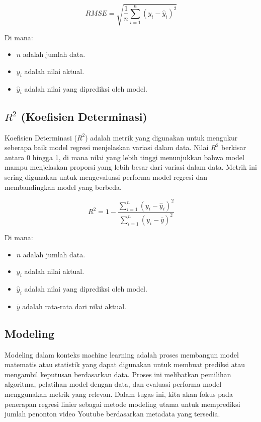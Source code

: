 \begin{equation}
    RMSE = \sqrt{\frac{1}{n} \sum_{i=1}^{n} (y_i - \hat{y}_i)^2}
\end{equation}

Di mana:
\begin{itemize}
    \item $n$ adalah jumlah data.
    \item $y_i$ adalah nilai aktual.
    \item $\hat{y}_i$ adalah nilai yang diprediksi oleh model.
\end{itemize}

\subsection{$R^2$ (Koefisien Determinasi)}
Koefisien Determinasi ($R^2$) adalah metrik yang digunakan untuk mengukur seberapa baik model regresi menjelaskan variasi dalam data. Nilai $R^2$ berkisar antara 0 hingga 1, di mana nilai yang lebih tinggi menunjukkan bahwa model mampu menjelaskan proporsi yang lebih besar dari variasi dalam data. Metrik ini sering digunakan untuk mengevaluasi performa model regresi dan membandingkan model yang berbeda.

\begin{equation}
    R^2 = 1 - \frac{\sum_{i=1}^{n} (y_i - \hat{y}_i)^2}{\sum_{i=1}^{n} (y_i - \bar{y})^2}
\end{equation}

Di mana:
\begin{itemize}
    \item $n$ adalah jumlah data.
    \item $y_i$ adalah nilai aktual.
    \item $\hat{y}_i$ adalah nilai yang diprediksi oleh model.
    \item $\bar{y}$ adalah rata-rata dari nilai aktual.
\end{itemize}

\subsection{Modeling}
Modeling dalam konteks machine learning adalah proses membangun model matematis atau statistik yang dapat digunakan untuk membuat prediksi atau mengambil keputusan berdasarkan data. Proses ini melibatkan pemilihan algoritma, pelatihan model dengan data, dan evaluasi performa model menggunakan metrik yang relevan. Dalam tugas ini, kita akan fokus pada penerapan regresi linier sebagai metode modeling utama untuk memprediksi jumlah penonton video Youtube berdasarkan metadata yang tersedia.


